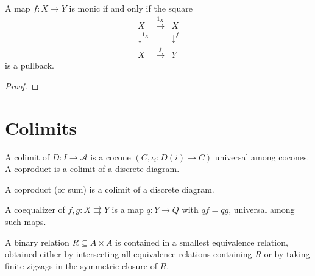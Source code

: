 \begin{lemma}
\label{lem:lbc-monic-equalizer}
A map $f:X\to Y$ is monic if and only if the square
\[
\begin{array}{ccc}
X&\xrightarrow{1_X}&X\\
\downarrow^{1_X}&&\downarrow^{f}\\
X&\xrightarrow{f}&Y
\end{array}
\]
is a pullback.
\end{lemma}
\begin{proof}
\notready
\end{proof}

\section{Colimits}
\begin{definition}[Colimit]
\label{def:lbc-colimit}
A colimit of $D:I\to\mathcal A$ is a cocone $(C,\iota_i:D(i)\to C)$ universal
among cocones. A coproduct is a colimit of a discrete diagram.
\end{definition}

\begin{definition}[Coproduct]
\label{def:lbc-coproduct}
A coproduct (or sum) is a colimit of a discrete diagram.
\end{definition}

\begin{definition}[Coequalizer]
\label{def:lbc-coequalizer}
A coequalizer of $f,g:X\rightrightarrows Y$ is a map $q:Y\to Q$ with
$qf=qg$, universal among such maps.
\end{definition}

\begin{remark}
\label{rem:lbc-generated-equivalence}
A binary relation $R\subseteq A\times A$ is contained in a smallest equivalence
relation, obtained either by intersecting all equivalence relations containing
$R$ or by taking finite zigzags in the symmetric closure of $R$.
\end{remark}

